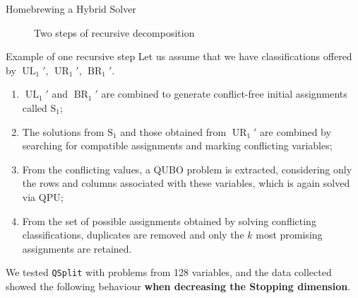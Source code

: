 \documentclass[final]{beamer}
\newlength{\colwidth}
\begin{document}
\begin{frame}[t,fragile]
\begin{columns}[t]
\begin{column}{\colwidth}
\begin{block}{Homebrewing a Hybrid Solver}
\begin{figure}[h!]
\begin{minipage}{0.4\textwidth}
        \caption{Two steps of recursive decomposition}
        \label{fig:qubo}
      \end{minipage}
    \end{figure}

    \begin{exampleblock}{Example of one recursive step}
      Let us assume that we have classifications offered by $\operatorname{UL}_1'$, $\operatorname{UR}_1'$, $\operatorname{BR}_1'$. 

      \begin{enumerate}
        \item $\operatorname{UL}_1'$ and $\operatorname{BR}_1'$ are combined to generate conflict-free initial assignments called $\operatorname{S_1}$;
        \item The solutions from $\operatorname{S_1}$ and those obtained from $\operatorname{UR}_1'$ are combined by searching for compatible assignments and marking conflicting variables;
        \item From the conflicting values, a QUBO problem is extracted, considering only the rows and columns associated with these variables, which is again solved via QPU;
        \item From the set of possible assignments obtained by solving conflicting classifications, duplicates are removed and only the $k$ most promising assignments are retained. 
      \end{enumerate}
    \end{exampleblock}

    We tested \texttt{QSplit} with problems from 128 variables, and the data collected showed the following behaviour \textbf{when decreasing the Stopping dimension}.


\end{block}
\end{column}
\end{columns}
\end{frame}
\end{document}

